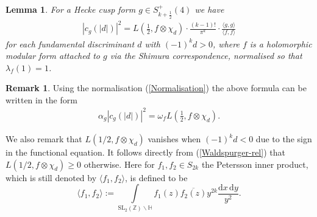 \documentclass[a4paper,10pt,twoside]{amsart}
\newtheorem{lemma}[theorem]{Lemma}
\theoremstyle{definition}
\newtheorem{rem}[theorem]{Remark}
\numberwithin{equation}{section}
\renewcommand\:{\colon}
\begin{document}
\begin{lemma} 
For a Hecke cusp form $g\in S^+_{k+\frac12}(4)$ we have
\begin{align}\label{Waldspurger-rel}
|c_g(|d|)|^2=L\left(\frac12,f\otimes\chi_d\right)\cdot\frac{(k-1)!}{\pi^k}\cdot\frac{\langle g,g\rangle}{\langle f,f\rangle}
\end{align}
for each fundamental discriminant $d$ with $(-1)^kd>0$, where $f$ is a holomorphic modular form attached to $g$ via the Shimura correspondence, normalised so that $\lambda_f(1)=1$. 
\end{lemma}

\begin{rem}
Using the normalisation (\ref{Normalisation}) the above formula can be written in the form
\begin{align}\label{W-rel} 
\alpha_g|c_g(|d|)|^2=\omega_fL\left(\frac12,f\otimes\chi_d\right).
\end{align}
\end{rem}

We also remark that $L(1/2,f\otimes\chi_d)$ vanishes when $(-1)^kd<0$ due to the sign in the functional equation. It follows directly from (\ref{Waldspurger-rel}) that $L(1/2,f\otimes\chi_d)\geq 0$ otherwise. Here for $f_1,f_2\in S_{2k}$ the Petersson inner product, which is still denoted by $\langle f_1,f_2\rangle$, is defined to be
\[ 
\langle f_1,f_2\rangle:=\int\limits_{\mathrm{SL}_2(\mathbb Z)\backslash\mathbb H}f_1(z)\overline{f_2(z)}y^{2k}\frac{\mathrm d x\,\mathrm d y}{y^2}.\]
\end{document}
